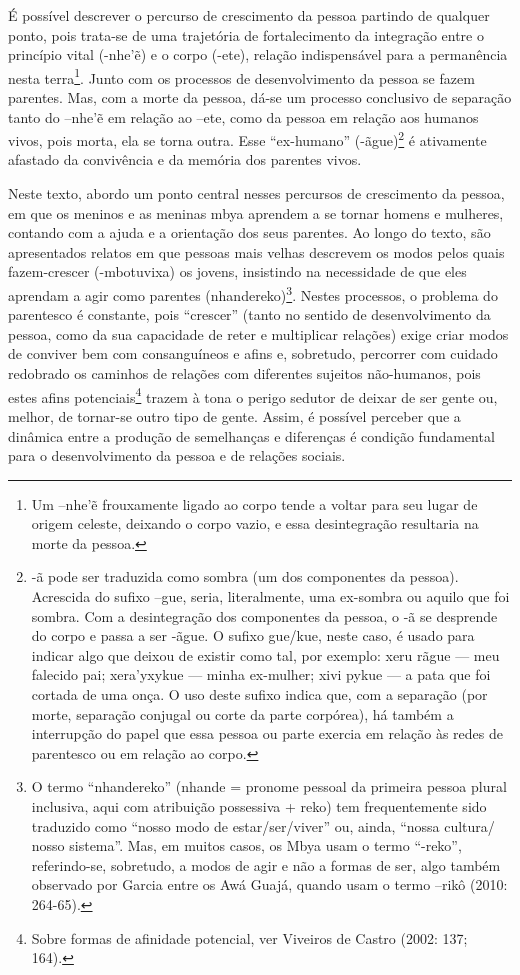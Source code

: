 É possível descrever o percurso de crescimento da pessoa partindo de
qualquer ponto, pois trata-se de uma trajetória de fortalecimento da
integração entre o princípio vital (-nhe’\~{e}) e o corpo (-ete),
relação indispensável para a permanência nesta terra\footnote{Um
–nhe’\~{e} frouxamente ligado ao corpo tende a voltar para seu lugar
de origem celeste, deixando o corpo vazio, e essa desintegração
resultaria na morte da pessoa.}. Junto com os processos de
desenvolvimento da pessoa se fazem parentes. Mas, com a morte da
pessoa, dá-se um processo conclusivo de separação tanto do –nhe’\~{e}
em relação ao –ete, como da pessoa em relação aos humanos vivos, pois
morta, ela se torna outra. Esse ``ex-humano'' (-ãgue)\footnote{-ã pode
ser traduzida como sombra (um dos componentes da pessoa). Acrescida do
sufixo –gue, seria, literalmente, uma ex-sombra ou aquilo que foi
sombra. Com a desintegração dos componentes da pessoa, o -ã se
desprende do corpo e passa a ser -ãgue. O sufixo gue/kue, neste caso, é
usado para indicar algo que deixou de existir como tal, por exemplo:
xeru rãgue --- meu falecido pai; xera’yxykue --- minha ex-mulher; xivi
pykue --- a pata que foi cortada de uma onça. O uso deste sufixo indica
que, com a separação (por morte, separação conjugal ou corte da parte
corpórea), há também a interrupção do papel que essa pessoa ou parte
exercia em relação às redes de parentesco ou em relação ao corpo.} é
ativamente afastado da convivência e da memória dos parentes vivos. 

Neste texto, abordo um ponto central nesses percursos de crescimento da
pessoa, em que os meninos e as meninas mbya aprendem a se tornar homens
e mulheres, contando com a ajuda e a orientação dos seus parentes. Ao
longo do texto, são apresentados relatos em que pessoas mais velhas
descrevem os modos pelos quais fazem-crescer (-mbotuvixa) os jovens,
insistindo na necessidade de que eles aprendam a agir como parentes
(nhandereko)\footnote{O termo ``nhandereko'' (nhande = pronome pessoal da
primeira pessoa plural inclusiva, aqui com atribuição possessiva +
reko) tem frequentemente sido traduzido como ``nosso modo de
estar/ser/viver'' ou, ainda, ``nossa cultura/ nosso sistema''. Mas, em
muitos casos, os Mbya usam o termo ``-reko'', referindo-se, sobretudo, a
modos de agir e não a formas de ser, algo também observado por Garcia
entre os Awá Guajá, quando usam o termo –rikô (2010: 264-65).}. Nestes
processos, o problema do parentesco é constante, pois ``crescer'' (tanto
no sentido de desenvolvimento da pessoa, como da sua capacidade de
reter e multiplicar relações) exige criar modos de conviver bem com
consanguíneos e afins e, sobretudo, percorrer com cuidado redobrado os
caminhos de relações com diferentes sujeitos não-humanos, pois estes
afins potenciais\footnote{Sobre formas de afinidade potencial, ver
Viveiros de Castro (2002: 137; 164).} trazem à tona o perigo sedutor de
deixar de ser gente ou, melhor, de tornar-se outro tipo de gente.
Assim, é possível perceber que a dinâmica entre a produção de
semelhanças e diferenças é condição fundamental para o desenvolvimento
da pessoa e de relações sociais.  

